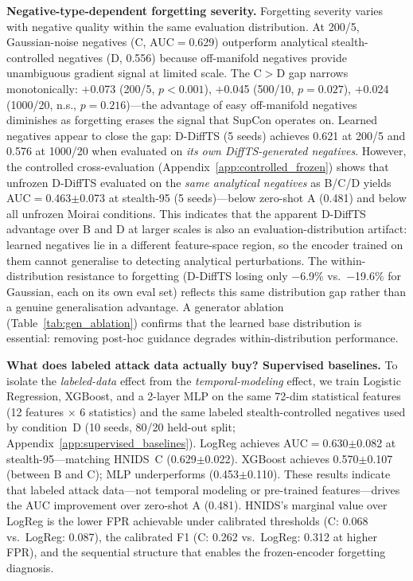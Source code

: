 \textbf{Negative-type-dependent forgetting severity.}
Forgetting severity varies with negative quality within the same evaluation
distribution.
At 200/5, Gaussian-noise negatives (C, AUC$=$0.629) outperform analytical
stealth-controlled negatives (D, 0.556) because off-manifold negatives provide
unambiguous gradient signal at limited scale.
The C$>$D gap narrows monotonically:
$+$0.073 (200/5, $p{<}0.001$), $+$0.045 (500/10, $p{=}0.027$),
$+$0.024 (1000/20, n.s., $p{=}0.216$)---the advantage of easy off-manifold
negatives diminishes as forgetting erases the signal that SupCon operates on.
Learned negatives appear to close the gap: D-DiffTS (5 seeds) achieves 0.621
at 200/5 and 0.576 at 1000/20 when evaluated on \emph{its own DiffTS-generated
negatives}.
However, the controlled cross-evaluation (Appendix~\ref{app:controlled_frozen})
shows that unfrozen D-DiffTS evaluated on the \emph{same analytical negatives}
as B/C/D yields AUC$=$0.463$\pm$0.073 at stealth-95 (5 seeds)---below
zero-shot A (0.481) and below all unfrozen Moirai conditions.
This indicates that the apparent D-DiffTS advantage over B and D at larger
scales is also an evaluation-distribution artifact: learned negatives lie
in a different feature-space region, so the encoder trained on them cannot
generalise to detecting analytical perturbations.
The within-distribution resistance to forgetting (D-DiffTS losing only $-$6.9\%
vs.\ $-$19.6\% for Gaussian, each on its own eval set) reflects this same
distribution gap rather than a genuine generalisation advantage.
A generator ablation (Table~\ref{tab:gen_ablation}) confirms that the learned
base distribution is essential: removing post-hoc guidance degrades
within-distribution performance.

\textbf{What does labeled attack data actually buy? Supervised baselines.}
To isolate the \emph{labeled-data} effect from the \emph{temporal-modeling}
effect, we train Logistic Regression, XGBoost, and a 2-layer MLP on the
same 72-dim statistical features (12 features $\times$ 6 statistics) and the
same labeled stealth-controlled negatives used by condition~D
(10 seeds, 80/20 held-out split; Appendix~\ref{app:supervised_baselines}).
LogReg achieves AUC$=$0.630$\pm$0.082 at stealth-95---matching
HNIDS~C (0.629$\pm$0.022).
XGBoost achieves 0.570$\pm$0.107 (between B and C);
MLP underperforms (0.453$\pm$0.110).
These results indicate that labeled attack data---not temporal modeling
or pre-trained features---drives the AUC improvement over zero-shot A (0.481).
HNIDS's marginal value over LogReg is the lower FPR achievable under
calibrated thresholds (C: 0.068 vs.\ LogReg: 0.087), the calibrated F1
(C: 0.262 vs.\ LogReg: 0.312 at higher FPR), and the sequential structure
that enables the frozen-encoder forgetting diagnosis.

